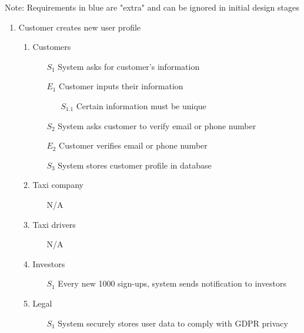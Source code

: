 \documentclass[]{article}
\begin{document}
Note: Requirements in blue are "extra" and can be ignored in initial design stages\\

\begin{enumerate}[{\textbf{BE}}1.]
    \item Customer creates new user profile
    \begin{enumerate}[{\textbf{VP}1}.1]
        \item Customers
            \begin{enumerate}
                \item[$S_1$] System asks for customer’s information
                \item[$E_1$] Customer inputs their information
                \begin{enumerate}
                    \item[$S_{1.1}$] Certain information must be unique
                \end{enumerate}
\color{blue}
                \item[$S_2$] System asks customer to verify email or phone number
                \item[$E_2$] Customer verifies email or phone number
\color{black}
                \item[$S_3$] System stores customer profile in database
            \end{enumerate}
        \item Taxi company
            \begin{enumerate}
                \item[N/A]
            \end{enumerate}
        \item Taxi drivers
            \begin{enumerate}
                \item[N/A]
            \end{enumerate}
        \item Investors
            \begin{enumerate}
	       \color{blue}
                \item[$S_1$] Every new 1000 sign-ups, system sends notification to investors
                \color{black}
            \end{enumerate}
        \item Legal
            \begin{enumerate}
                \item[$S_1$] System securely stores user data to comply with GDPR privacy

\end{enumerate}
\end{enumerate}
\end{enumerate}
\end{document}

